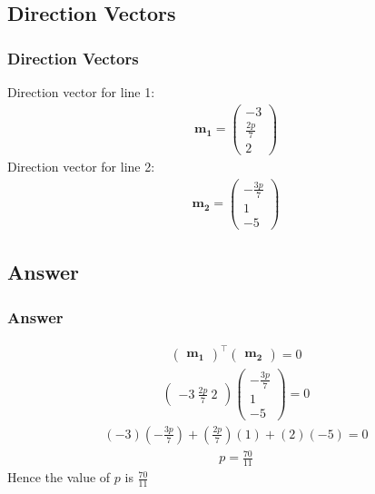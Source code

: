 \documentclass{beamer}
\providecommand{\brak}[1]{\ensuremath{\left(#1\right)}}
\theoremstyle{remark}
\newcommand{\myvec}[1]{\ensuremath{\begin{pmatrix}#1\end{pmatrix}}}
\let\vec\mathbf
\numberwithin{equation}{section}
\begin{document}
\subsection{Direction Vectors}
\begin{frame}
\frametitle{Direction Vectors}
Direction vector for line 1:
\begin{align}
\vec{m_1} = \myvec{-3 \\ \frac{2p}{7} \\ 2}
\end{align}
Direction vector for line 2:
\begin{align}
\vec{m_2} = \myvec{-\frac{3p}{7} \\ 1 \\ -5}
\end{align}
\end{frame}

\subsection{Answer}
\begin{frame}
\frametitle{Answer}
\begin{align}
\myvec{\vec{m_1}}^\top\myvec{\vec{m_2}} = 0 
\end{align}
\begin{align}
\myvec{-3 \ \frac{2p}{7} \ 2}\myvec{-\frac{3p}{7} \\ 1 \\ -5}=0  
\end{align}
\begin{align}
\brak{-3}\brak{-\frac{3p}{7}} + \brak{\frac{2p}{7}}\brak{1} + \brak{2}\brak{-5} = 0
\end{align}
\begin{align}
p = \frac{70}{11}
\end{align}
Hence the value of $p$ is $\frac{70}{11}$
\end{frame}
\end{document}
